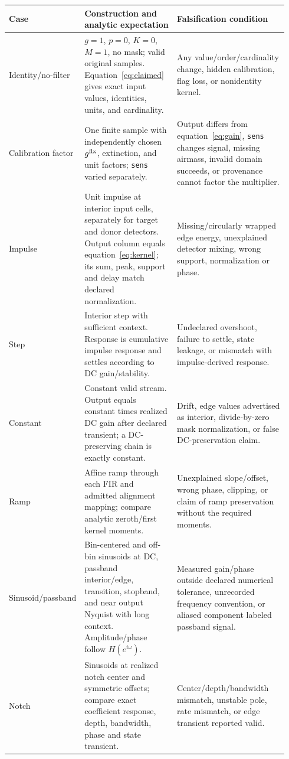 \documentclass[11pt]{article}
\newcommand{\code}[1]{\nolinkurl{#1}}
\begin{document}
\begin{longtable}{@{}p{0.18\linewidth}p{0.34\linewidth}p{0.42\linewidth}@{}}
\toprule
Case & Construction and analytic expectation & Falsification condition \\
\midrule
\endhead
Identity/no-filter & $g=1$, $p=0$, $K=0$, $M=1$, no mask; valid original samples.  Equation~\eqref{eq:claimed} gives exact input values, identities, units, and cardinality. & Any value/order/cardinality change, hidden calibration, flag loss, or nonidentity kernel. \\
Calibration factor & One finite sample with independently chosen $g^{\rm flx}$, extinction, and unit factors; \code{sens} varied separately. & Output differs from equation~\eqref{eq:gain}, \code{sens} changes signal, missing airmass, invalid domain succeeds, or provenance cannot factor the multiplier. \\
Impulse & Unit impulse at interior input cells, separately for target and donor detectors.  Output column equals equation~\eqref{eq:kernel}; its sum, peak, support and delay match declared normalization. & Missing/circularly wrapped edge energy, unexplained detector mixing, wrong support, normalization or phase. \\
Step & Interior step with sufficient context.  Response is cumulative impulse response and settles according to DC gain/stability. & Undeclared overshoot, failure to settle, state leakage, or mismatch with impulse-derived response. \\
Constant & Constant valid stream.  Output equals constant times realized DC gain after declared transient; a DC-preserving chain is exactly constant. & Drift, edge values advertised as interior, divide-by-zero mask normalization, or false DC-preservation claim. \\
Ramp & Affine ramp through each FIR and admitted alignment mapping; compare analytic zeroth/first kernel moments. & Unexplained slope/offset, wrong phase, clipping, or claim of ramp preservation without the required moments. \\
Sinusoid/passband & Bin-centered and off-bin sinusoids at DC, passband interior/edge, transition, stopband, and near output Nyquist with long context.  Amplitude/phase follow $H(e^{i\omega})$. & Measured gain/phase outside declared numerical tolerance, unrecorded frequency convention, or aliased component labeled passband signal. \\
Notch & Sinusoids at realized notch center and symmetric offsets; compare exact coefficient response, depth, bandwidth, phase and state transient. & Center/depth/bandwidth mismatch, unstable pole, rate mismatch, or edge transient reported valid. \\

\end{longtable}
\end{document}
